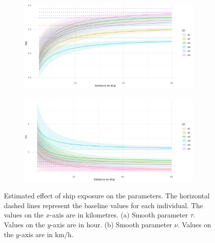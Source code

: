 \documentclass[11pt]{article}
\newcommand {\1}{\mathbb{1}}
\theoremstyle{definition}
\theoremstyle{remark}
\theoremstyle{remark}
\begin{document}
 \begin{figure}[H]
 	\begin{subfigure}{0.98\textwidth}\centering
 		\includegraphics[width=0.7\linewidth]{"images/application/response/me_response3_exp_tau_ExpShip.png"}
 		\caption{}
 	\end{subfigure}
 	
 	\begin{subfigure}{0.98\textwidth}
 		\centering
 		\includegraphics[width=0.7\linewidth]{"images/application/response/me_response3_exp_nu_ExpShip.png"}
 		\caption{}
 	\end{subfigure}
 	\caption{Estimated effect of ship exposure on the parameters. The horizontal dashed lines represent the baseline values for each individual. The values on the $x$-axis are in kilometres. (a)  Smooth parameter $\tau$. Values on the $y$-axis are in hour. (b) Smooth parameter $\nu$. Values on the $y$-axis are in km/h.}
 	\label{fig: me response}
 \end{figure}
\end{document}
